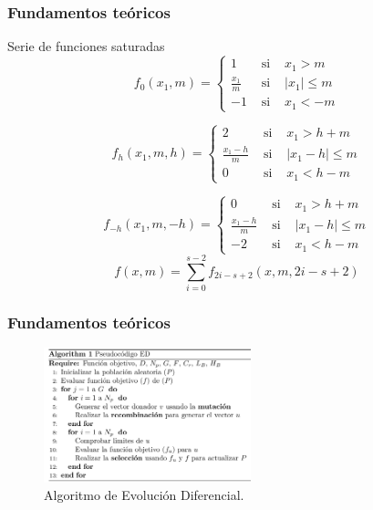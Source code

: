 \documentclass[10pt]{beamer}
\begin{document}
	\begin{frame}
		\frametitle{Fundamentos teóricos}
		\begin{block}{Serie de funciones saturadas}
		\justifying
		\begin{equation} 
	f_{0}(x_{1},m)= \left\{ \begin{array}{lcl}
	1 & \text{ si } & x_{1} > m \\
	\frac{x_{1}}{m}& \text{ si } & |x_{1}| \leq m\\
	-1 & \text{ si } & x_{1} < -m
	\end{array}
	\right.
	\label{ec:f0}
\end{equation}


\begin{equation} 
	f_{h}(x_{1},m,h)= \left\{ \begin{array}{lcl}
	2 & \text{ si } & x_{1} > h + m \\
	\frac{x_{1}-h}{m}& \text{ si } & |x_{1} - h| \leq m\\
	0 & \text{ si } & x_{1} < h-m
	\end{array}
	\right.
		\label{ec:fh}
\end{equation}

\begin{equation} 
	f_{-h}(x_{1},m,-h)= \left\{ \begin{array}{lcl}
	0 & \text{ si } & x_{1} > h + m \\
	\frac{x_{1}-h}{m}& \text{ si } & |x_{1} - h| \leq m\\
	-2 & \text{ si } & x_{1} < h-m
	\end{array}
	\right.
		\label{ec:f-h}
\end{equation}
		\begin{equation}
f(x,m) = \sum_{i=0}^{s-2} f_{2i-s+2}(x,m,2i-s+2)
\label{ec:general_serie}
\end{equation}
		\end{block}
	\end{frame}
	\begin{frame}
		\frametitle{Fundamentos teóricos}

		
		\begin{figure}[hbtp]
			\centering
			\includegraphics[width = 6cm]{alg1.png}
			\caption{Algoritmo de Evolución Diferencial.}
		\end{figure}
		
	\end{frame}
\end{document}
